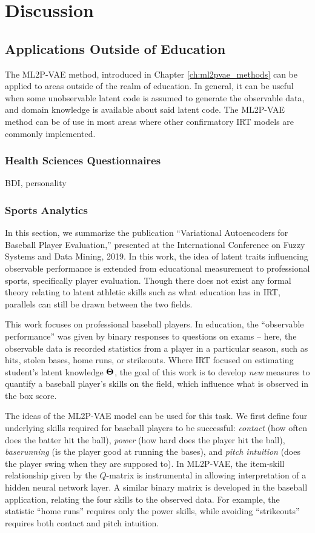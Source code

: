 \chapter{Discussion}\label{ch:conclusion}

\section{Applications Outside of Education}\label{sec:related_work}
The ML2P-VAE method, introduced in Chapter \ref{ch:ml2pvae_methods} can be applied to areas outside of the realm of education. In general, it can be useful when some unobservable latent code is assumed to generate the observable data, and domain knowledge is available about said latent code. The ML2P-VAE method can be of use in most areas where other confirmatory IRT models are commonly implemented. 

\subsection{Health Sciences Questionnaires}
BDI, personality 

\subsection{Sports Analytics}
In this section, we summarize the publication ``Variational Autoencoders for Baseball Player Evaluation,'' \cite{fsdm_paper} presented at the International Conference on Fuzzy Systems and Data Mining, 2019. In this work, the idea of latent traits influencing observable performance is extended from educational measurement to professional sports, specifically player evaluation. Though there does not exist any formal theory relating to latent athletic skills such as what education has in IRT, parallels can still be drawn between the two fields.

This work focuses on professional baseball players. In education, the ``observable performance'' was given by binary responses to questions on exams -- here, the observable data is recorded statistics from a player in a particular season, such as hits, stolen bases, home runs, or strikeouts. Where IRT focused on estimating student's latent knowledge $\boldsymbol{\Theta}$, the goal of this work is to develop \textit{new} measures to quantify a baseball player's skills on the field, which influence what is observed in the box score.

The ideas of the ML2P-VAE model can be used for this task. We first define four underlying skills required for baseball players to be successful: \textit{contact} (how often does the batter hit the ball), \textit{power} (how hard does the player hit the ball), \textit{baserunning} (is the player good at running the bases), and \textit{pitch intuition} (does the player swing when they are supposed to). In ML2P-VAE, the item-skill relationship given by the $Q$-matrix is instrumental in allowing interpretation of a hidden neural network layer. A similar binary matrix is developed in the baseball application, relating the four skills to the observed data. For example, the statistic ``home runs'' requires only the power skills, while avoiding ``strikeouts'' requires both contact and pitch intuition.

